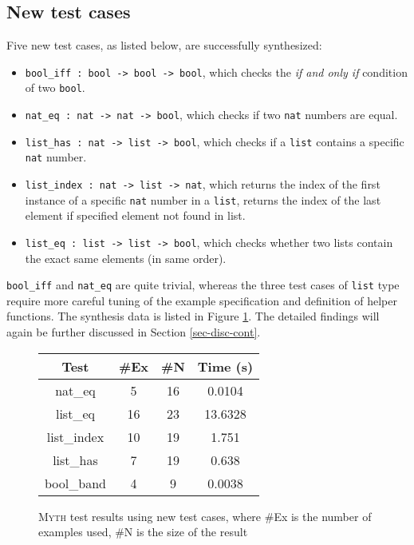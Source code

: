 \documentclass[preprint, 11pt]{sigplanconf}
\begin{document}
\subsection{New test cases}\label{sec-newc}

Five new test cases, as listed below, are successfully synthesized:

\begin{itemize}
  \item \texttt{bool\_iff : bool -> bool -> bool}, which checks the \emph{if and only if} condition of two \texttt{bool}.
  \item \texttt{nat\_eq : nat -> nat -> bool}, which checks if two \texttt{nat} numbers are equal.
  \item \texttt{list\_has : nat -> list -> bool}, which checks if a \texttt{list} contains a specific \texttt{nat} number.
  \item \texttt{list\_index : nat -> list -> nat}, which returns the index of the first instance of a specific \texttt{nat} number in a \texttt{list}, returns the index of the last element if specified element not found in list.
  \item \texttt{list\_eq : list -> list -> bool}, which checks whether two lists contain the exact same elements (in same order).
\end{itemize}

\texttt{bool\_iff} and \texttt{nat\_eq} are quite trivial, whereas the three test cases of \texttt{list} type require more careful tuning of the example specification and definition of helper functions. The synthesis data is listed in Figure \ref{fig-newc}. The detailed findings will again be further discussed in Section \ref{sec-disc-cont}.\\

\begin{figure}[!ht]
  \begin{center}
  \begin{tabular}{cccc}
  \hline
  \textbf{Test} & \textbf{ \#Ex } & \textbf{ \#N } & \textbf{Time (s)} \\
  \hline
  nat\_eq & 5 & 16 & 0.0104 \\
  list\_eq & 16 & 23 & 13.6328 \\
  list\_index & 10 & 19 & 1.751 \\
  list\_has & 7 & 19 & 0.638 \\
  bool\_band & 4 & 9 & 0.0038 \\
  \hline
  \end{tabular}
  \end{center}
  \caption{\textsc{Myth} test results using new test cases, where \#Ex is the number of examples used, \#N is the size of the result}
  \label{fig-newc}
\end{figure}
\end{document}
